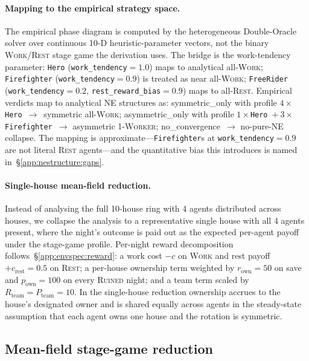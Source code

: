 \documentclass{anvil-paper}
\begin{document}
\paragraph{Mapping to the empirical strategy space.}
The empirical phase diagram is computed by the heterogeneous
Double-Oracle solver over continuous 10-D heuristic-parameter vectors,
not the binary \textsc{Work}/\textsc{Rest} stage game the derivation
uses. The bridge is the work-tendency parameter: \texttt{Hero}
(\texttt{work\_tendency}${=}1.0$) maps to analytical all-\textsc{Work};
\texttt{Firefighter} (\texttt{work\_tendency}${=}0.9$) is treated as
near all-\textsc{Work}; \texttt{FreeRider}
(\texttt{work\_tendency}${=}0.2$, \texttt{rest\_reward\_bias}${=}0.9$)
maps to all-\textsc{Rest}. Empirical verdicts map to analytical NE
structures as: \textsf{symmetric\_only} with profile
$4{\times}$\texttt{Hero}~$\to$~symmetric all-\textsc{Work};
\textsf{asymmetric\_only} with profile
$1{\times}$\texttt{Hero}~$+~3{\times}$\texttt{Firefighter}~$\to$
asymmetric 1-\textsc{Worker}; \textsf{no\_convergence}~$\to$ no-pure-NE
collapse. The mapping is approximate---\texttt{Firefighter}s at
\texttt{work\_tendency}${=}0.9$ are not literal \textsc{Rest}
agents---and the quantitative bias this introduces is named
in~\S\ref{app:nestructure:gaps}.

\paragraph{Single-house mean-field reduction.}
Instead of analysing the full 10-house ring with 4 agents distributed
across houses, we collapse the analysis to a representative single house
with all 4 agents present, where the night's outcome is paid out as the
expected per-agent payoff under the stage-game profile. Per-night
reward decomposition follows~\S\ref{app:envspec:reward}: a work cost
$-c$ on \textsc{Work} and rest payoff $+c_{\text{rest}}{=}0.5$ on
\textsc{Rest}; a per-house ownership term weighted by
$r_{\text{own}}{=}50$ on save and $p_{\text{own}}{=}100$ on every
\textsc{Ruined} night; and a team term scaled by
$R_{\text{team}}{=}P_{\text{team}}{=}10$. In the single-house reduction
ownership accrues to the house's designated owner and is shared equally
across agents in the steady-state assumption that each agent owns one
house and the rotation is symmetric.

\subsection{Mean-field stage-game reduction}
\label{app:nestructure:reduction}
\end{document}

